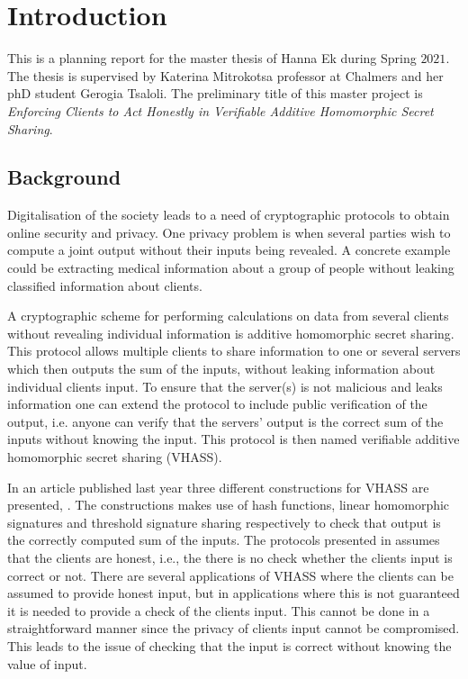 \documentclass[12pt,a4paper]{article}
\begin{document}
\begin{titlepage}

\end{titlepage}
\newpage
\tableofcontents  
\newpage
{}
\setcounter{page}{1}
\section{Introduction}
This is a planning report for the master thesis of Hanna Ek during Spring $2021$. The thesis is supervised by Katerina Mitrokotsa professor at Chalmers and her phD student Gerogia Tsaloli. The preliminary title of this master project is \textit{Enforcing Clients to Act Honestly in Verifiable Additive Homomorphic Secret Sharing}.

\subsection{Background}
Digitalisation of the society leads to a need of cryptographic protocols to obtain online security and privacy. One privacy problem is when several parties wish to compute a joint output without their inputs being revealed. A concrete example could be extracting medical information about a group of people without leaking classified information about clients.

A cryptographic scheme for performing calculations on data from several clients without revealing individual information is additive homomorphic secret sharing. This protocol allows multiple clients to share information to one or several servers which then outputs the sum of the inputs, without leaking information about individual clients input. To ensure that the server(s) is not malicious and leaks information one can extend the protocol to include public verification of the output, i.e. anyone can verify that the servers' output is the correct sum of the inputs without knowing the input. This protocol is then named verifiable additive homomorphic secret sharing (VHASS). 

In an article published last year three different constructions for VHASS are presented, \cite{Georgia-orginal}. The constructions makes use of hash functions, linear homomorphic signatures and threshold signature sharing respectively to check that output is the correctly computed sum of the inputs. The protocols presented in \cite{Georgia-orginal} assumes that the clients are honest, i.e., the there is no check whether the clients input is correct or not. There are several applications of VHASS where the clients can be assumed to provide honest input, but in applications where this is not guaranteed it is needed to provide a check of the clients input. This cannot be done in a straightforward manner since the privacy of clients input cannot be compromised. This leads to the issue of checking that the input is correct without knowing the value of input. 
\end{document}
